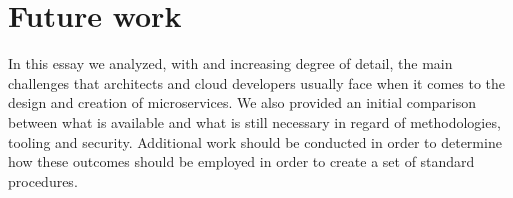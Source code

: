 \documentclass[a4paper, 10pt, conference]{ieeeconf}
\begin{document}
\section{Future work}

In this essay we analyzed, with and increasing degree of detail, the main challenges that architects and cloud developers usually face when it comes to the design and creation of microservices. We also provided an initial comparison between what is available and what is still necessary in regard of methodologies, tooling and security. Additional work should be conducted in order to determine how these outcomes should be employed in order to create a set of standard procedures.





\end{document}
